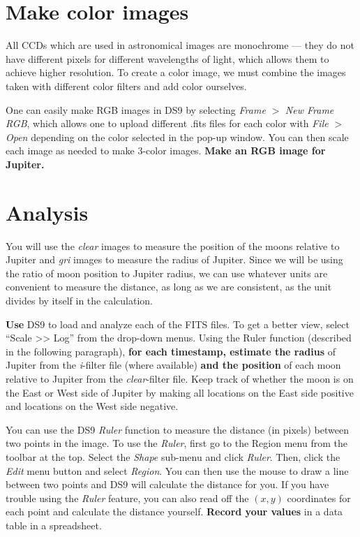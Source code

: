 \section{Make color images}

All CCDs which are used in astronomical images are monochrome --- they do not have different pixels for different wavelengths of light, which allows them to achieve higher resolution. To create a color image, we must combine the images taken with different color filters and add color ourselves.

One can easily make RGB images in DS9 by selecting \textit{Frame} $>$ \textit{New Frame RGB}, which allows one to upload different .fits files for each color with \textit{File} $>$ \textit{Open} depending on the color selected in the pop-up window. You can then scale each image as needed to make 3-color images. \textbf{Make an RGB image for Jupiter.}

\section{Analysis}

You will use the \textit{clear} images to measure the position of the moons relative to Jupiter and
\textit{gri} images to measure the radius of Jupiter. Since we will be using the ratio of moon position to Jupiter radius, we can use whatever units are convenient to measure the distance, as long as we are consistent, as the unit divides by itself in the calculation.

\begin{steps}
	\item \textbf{Use} DS9 to load and analyze each of the FITS files. To get a better view, select ``Scale >> Log'' from the drop-down menus. Using the Ruler function (described in the following paragraph), \textbf{for each timestamp, estimate the radius} of Jupiter from the \textit{i}-filter file (where available) \textbf{and the position} of each moon relative to Jupiter from the \textit{clear}-filter file. Keep track of whether the moon is on the East or West side of Jupiter by making all locations on the East side positive and locations on the West side negative.
\end{steps}

You can use the DS9 \textit{Ruler} function to measure the distance (in pixels) between two points in the image. To use the \textit{Ruler}, first go to the Region menu from the toolbar at the top. Select the \textit{Shape} sub-menu and click \textit{Ruler}. Then, click the \textit{Edit} menu button and select \textit{Region}. You can then use the mouse to draw a line between two points and DS9 will calculate the distance for you. If you have trouble using the \textit{Ruler} feature, you can also read off the $(x,y)$ coordinates for each point and calculate the distance yourself. \textbf{Record your values} in a data table in a spreadsheet.


